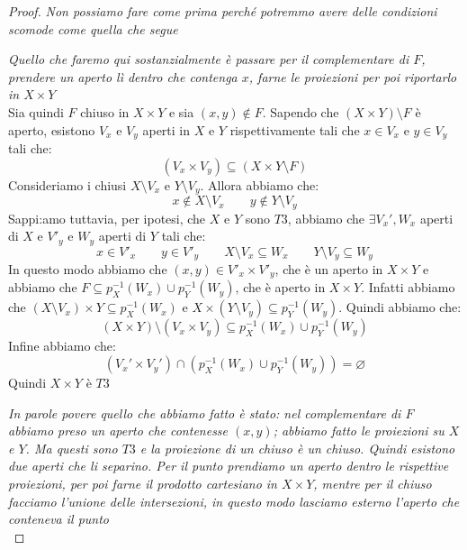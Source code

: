 \documentclass[11pt,a4paper,twoside]{article}
\theoremstyle{definition}
\begin{document}
\begin{proof}
	 \textit{Non possiamo fare come prima perché potremmo avere delle condizioni scomode come quella che segue}
	\begin{center}
	\end{center}
	\textit{Quello che faremo qui sostanzialmente è passare per il complementare di $F$, prendere un aperto lì dentro che contenga $x$, farne le proiezioni per poi riportarlo in $X \times Y$}\\
	Sia quindi $F$ chiuso in $X \times Y$ e sia $(x, y) \not \in F$. Sapendo che $(X \times Y)\setminus F$ è aperto, esistono $V_x$ e $V_y$ aperti in $X$ e $Y$ rispettivamente tali che $x \in V_x$ e $y \in V_y$ tali che:
	\[ (V_x\times V_y) \subseteq (X \times Y \setminus F) \]
	Consideriamo i chiusi $X \setminus V_x$ e $Y \setminus V_y$. Allora abbiamo che:
	\[ x \not \in X \setminus V_x\qquad y \not \in Y\setminus V_y \]
	Sappi:amo tuttavia, per ipotesi, che $X$ e $Y$ sono $T3$, abbiamo che $\exists V_x', W_x$ aperti di $X$ e $V'_y$ e $W_y$ aperti di $Y$ tali che:
	\[ x \in V'_x\qquad y \in V'_y \qquad X \setminus V_x \subseteq W_x\qquad Y \setminus V_y \subseteq W_y\]
	In questo modo abbiamo che $(x,y) \in V'_x \times V'_y$, che è un aperto in $X \times Y$ e abbiamo che $F \subseteq p_X^{-1}(W_x) \cup p^{-1}_Y(W_y)$, che è aperto in $X \times Y$.
	Infatti abbiamo che $(X\setminus V_x) \times Y \subseteq p_X^{-1}(W_x)$ e $X\times (Y \setminus V_y)\subseteq p_Y^{-1}(W_y)$. Quindi abbiamo che:
	\[ (X \times Y) \setminus (V_x \times V_y) \subseteq p_X^{-1}(W_x) \cup p_Y^{-1}(W_y) \]
	Infine abbiamo che:
	\[ (V_x' \times V_y') \cap (p^{-1}_X(W_x) \cup p_Y^{-1}(W_y)) = \varnothing\]
	Quindi $X \times Y$ è $T3$

	\textit{In parole povere quello che abbiamo fatto è stato: nel complementare di $F$ abbiamo preso un aperto che contenesse $(x,y)$; abbiamo fatto le proiezioni su $X$ e $Y$. Ma questi sono $T3$ e la proiezione di un chiuso è un chiuso. Quindi esistono due aperti che li separino. Per il punto prendiamo un aperto dentro le rispettive proiezioni, per poi farne il prodotto cartesiano in $X \times Y$, mentre per il chiuso facciamo l'unione delle intersezioni, in questo modo lasciamo esterno l'aperto che conteneva il punto}\\
\end{proof}
\end{document}
